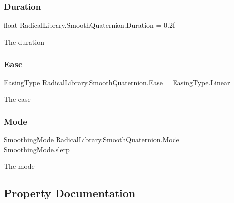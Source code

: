 \subsubsection{\texorpdfstring{Duration}{Duration}}
{\footnotesize\ttfamily float Radical\+Library.\+Smooth\+Quaternion.\+Duration = 0.\+2f}



The duration 

\mbox{\label{class_radical_library_1_1_smooth_quaternion_abcd64e7ee93afd9bba94a7cff0a30c44}} 
\subsubsection{\texorpdfstring{Ease}{Ease}}
{\footnotesize\ttfamily \hyperlink{namespace_radical_library_a2d6877adaf2ec492cf30c572aa684e6f}{Easing\+Type} Radical\+Library.\+Smooth\+Quaternion.\+Ease = \hyperlink{namespace_radical_library_a2d6877adaf2ec492cf30c572aa684e6fa32a843da6ea40ab3b17a3421ccdf671b}{Easing\+Type.\+Linear}}



The ease 

\mbox{\label{class_radical_library_1_1_smooth_quaternion_ace7603e6500795d9d9334787f03a730c}} 
\subsubsection{\texorpdfstring{Mode}{Mode}}
{\footnotesize\ttfamily \hyperlink{namespace_radical_library_a53ca8c4ff40f917ad8d03bb2c0dbd548}{Smoothing\+Mode} Radical\+Library.\+Smooth\+Quaternion.\+Mode = \hyperlink{namespace_radical_library_a53ca8c4ff40f917ad8d03bb2c0dbd548ab3e5b7b54ffda84cdd1cfffb503170be}{Smoothing\+Mode.\+slerp}}



The mode 



\subsection{Property Documentation}
\mbox{\label{class_radical_library_1_1_smooth_quaternion_a9cfbac21089a16c9668e3ff0092b0adf}} 
